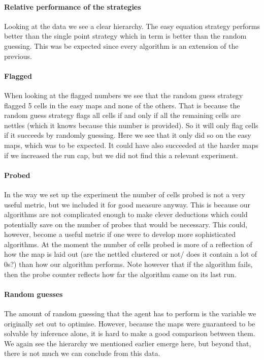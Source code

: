 \documentclass[british]{article}
\begin{document}
\paragraph{Relative performance of the strategies} Looking at the data we see a clear hierarchy. The easy equation strategy performs better than the single point strategy which in term is better than the random guessing. This was be expected since every algorithm is an extension of the previous. 
\paragraph{Flagged} When looking at the flagged numbers we see that the random guess strategy flagged 5 cells in the easy maps and none of the others. That is because the random guess strategy flags all cells if and only if all the remaining cells are nettles (which it knows because this number is provided). So it will only flag cells if it succeeds by randomly guessing. Here we see that it only did so on the easy maps, which was to be expected. It could have also succeeded at the harder maps if we increased the run cap, but we did not find this a relevant experiment.
\paragraph{Probed} In the way we set up the experiment the number of cells probed is not a very useful metric, but we included it for good measure anyway. This is because our algorithms are not complicated enough to make clever deductions which could potentially save on the number of probes that would be necessary. This could, however, become a useful metric if one were to develop more sophisticated algorithms. At the moment the number of cells probed is more of a reflection of how the map is laid out (are the nettled clustered or not/ does it contain a lot of 0s?) than how our algorithm performs. Note however that if the algorithm fails, then the probe counter reflects how far the algorithm came on its last run.
\paragraph{Random guesses} The amount of random guessing that the agent has to perform is the variable we originally set out to optimise. However, because the maps were guaranteed to be solvable by inference alone, it is hard to make a good comparison between them. We again see the hierarchy we mentioned earlier emerge here, but beyond that, there is not much we can conclude from this data.
\end{document}
